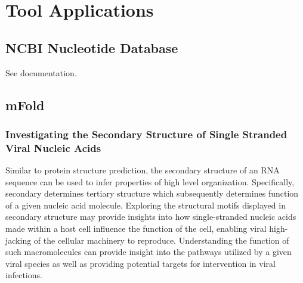 \section{Tool Applications}

    \subsection{NCBI Nucleotide Database}

    See documentation.\autocite{B18}

    \subsection{mFold}

        \subsubsection{Investigating the Secondary Structure of Single Stranded Viral Nucleic Acids}

        Similar to protein structure prediction, the secondary structure of an RNA sequence can be used to infer properties of high level organization.\autocite{L8} Specifically, secondary determines tertiary structure which subsequently determines function of a given nucleic acid molecule.\autocite{L8} Exploring the structural motifs displayed in secondary structure may provide insights into how single-stranded nucleic acids made within a host cell influence the function of the cell, enabling viral high-jacking of the cellular machinery to reproduce. Understanding the function of such macromolecules can provide insight into the pathways utilized by a given viral species as well as providing potential targets for intervention in viral infections.
